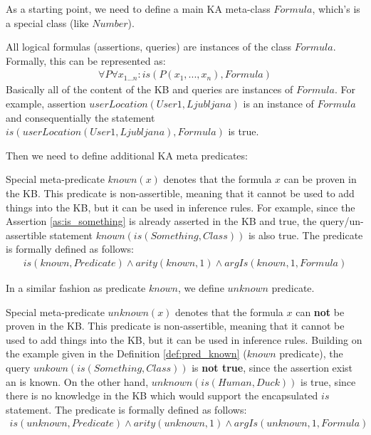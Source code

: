 As a starting point, we need to define a main KA meta-class $Formula$, which’s 
is a special class (like $Number$).
\begin{definition}\label{def:formula}
All logical formulas (assertions, queries) are instances of the class $Formula$.
Formally, this can be represented as:
\begin{equation}\label{as:formulas}
\begin{gathered}
	\forall P\forall x_{1...n}:is(P(x_1,...,x_n),Formula)
\end{gathered}
\end{equation}
Basically all of the content of the KB and queries are instances of $Formula$.
For example, assertion $userLocation(User1,Ljubljana)$ is an instance of 
$Formula$ and consequentially the statement $is(userLocation(User1,Ljubljana),
Formula)$ is true.
\end{definition}

Then we need to define additional KA meta predicates:

\begin{definition}\label{def:pred_known}
Special meta-predicate $known(x)$ denotes that the formula $x$ can be proven 
in the KB. This predicate is non-assertible, meaning that it cannot be used
to add things into the KB, but it can be used in inference rules. For example,
since the Assertion \ref{as:is_something} is already asserted in the KB and 
true, the query/un-assertible statement $known(is(Something,Class))$ is also 
true. The predicate is formally defined as follows:
\begin{equation}\label{as:known}
\begin{gathered}
	is(known,Predicate) \land arity(known,1) \land argIs(known,1,Formula)
\end{gathered}
\end{equation}
\end{definition}

In a similar fashion as predicate $known$, we define $unknown$ predicate.

\begin{definition}\label{def:pred_unknown}
Special meta-predicate $unknown(x)$ denotes that the formula $x$ can 
\textbf{not} be proven in the KB. This predicate is non-assertible, meaning that it cannot be used to add things into the KB, but it can be used in inference 
rules. Building on the example given in the Definition \ref{def:pred_known}
($known$ predicate), the query $unkown(is(Something,Class))$ is 
\textbf{not true}, since the assertion exist an is known. On the other hand,
$unknown(is(Human,Duck))$ is true, since there is no knowledge in the KB which
would support the encapsulated $is$ statement. The predicate is formally defined as follows:
\begin{equation}\label{as:unknown}
\begin{gathered}
	is(unknown,Predicate) \land arity(unknown,1) \land argIs(unknown,1,Formula)
\end{gathered}
\end{equation}
\end{definition}

